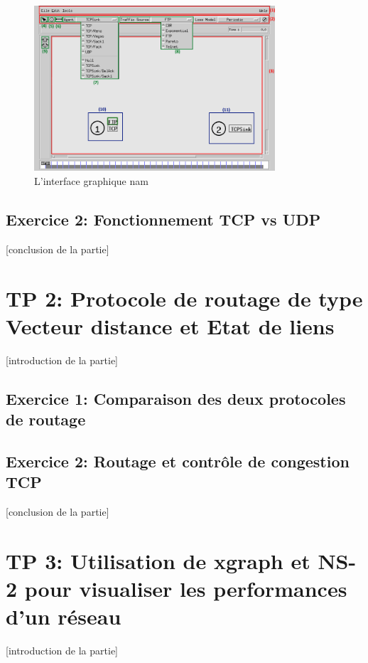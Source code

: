 \documentclass[11pt]{article}
\begin{document}
\begin{figure}[H]
	\begin{center}
		\includegraphics[width=0.8\textwidth]{assets/tp1/explicationNam.png}
	\end{center}
	\caption{L'interface graphique nam}
	\label{namExplcation}
\end{figure}

\subsection{Exercice 2: Fonctionnement TCP vs UDP}



[conclusion de la partie]


\pagebreak
\section{TP 2: Protocole de routage de type Vecteur distance et Etat de liens}
[introduction de la partie]

\subsection{Exercice 1: Comparaison des deux protocoles de routage}


\subsection{Exercice 2: Routage et contrôle de congestion TCP}

[conclusion de la partie]

\pagebreak
\section{TP 3: Utilisation de xgraph et NS-2 pour visualiser les performances d'un réseau}
[introduction de la partie]
\end{document}
